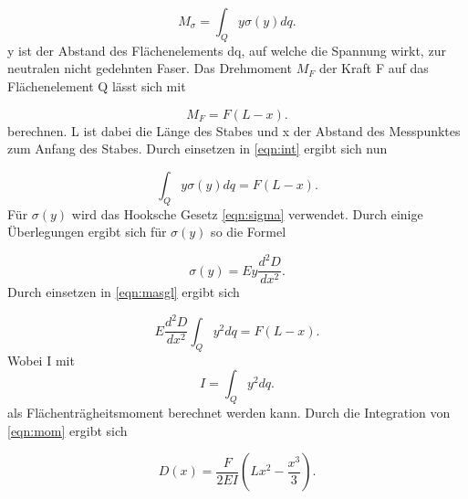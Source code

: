 \begin{equation}
  M_\sigma = \int_Q y\sigma(y)dq.
  \label{eqn:int}
\end{equation}
y ist der Abstand des Flächenelements dq, auf welche die Spannung \sigma wirkt, zur neutralen nicht gedehnten Faser.
Das Drehmoment $M_F$ der Kraft F auf das Flächenelement Q lässt sich mit

\begin{equation*}
  M_F=F(L-x).
  \label{eqn:M_F}
\end{equation*}
berechnen. L ist dabei die Länge des Stabes und x der Abstand des Messpunktes zum Anfang des Stabes.
Durch einsetzen in \eqref{eqn:int} ergibt sich nun

\begin{equation}
  \int_Qy \sigma(y)dq=F(L-x).
  \label{eqn:masgl}
\end{equation}
Für $\sigma(y)$ wird das Hooksche Gesetz \eqref{eqn:sigma} verwendet.
Durch einige Überlegungen ergibt sich für $\sigma(y)$ so die Formel

 \begin{equation*}
    \sigma(y) = E y \frac{d^2D}{dx^2}.
    \label{eqn:sigmay}
  \end{equation*}
Durch einsetzen in \eqref{eqn:masgl} ergibt sich

\begin{equation}
  E  \frac{d^2D}{dx^2} \int_Qy^2dq = F(L-x).
  \label{eqn:mom}
\end{equation}
Wobei I mit
\begin{equation}
   I=\int_Qy^2dq.
  \label{eqn:i}
\end{equation}
als Flächenträgheitsmoment berechnet werden kann.
Durch die Integration von \eqref{eqn:mom} ergibt sich

\begin{equation}
  D(x) =     \frac{F}{2EI}(Lx^2-\frac{x^3}{3}).
  \label{eqn:dx}
\end{equation}



